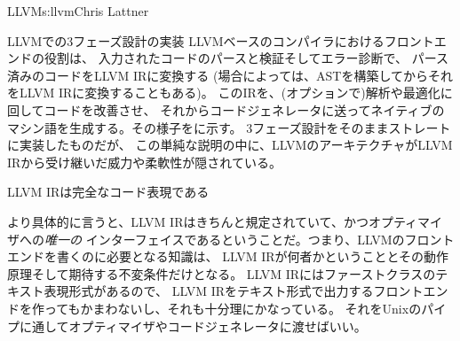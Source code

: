 \begin{aosachapter}{LLVM}{s:llvm}{Chris Lattner}
\begin{aosasect1}{LLVMでの3フェーズ設計の実装}
LLVMベースのコンパイラにおけるフロントエンドの役割は、
入力されたコードのパースと検証そしてエラー診断で、
パース済みのコードをLLVM IRに変換する
(場合によっては、ASTを構築してからそれをLLVM IRに変換することもある)。
このIRを、(オプションで)解析や最適化に回してコードを改善させ、
それからコードジェネレータに送ってネイティブのマシン語を生成する。その様子をに示す。
3フェーズ設計をそのままストレートに実装したものだが、
この単純な説明の中に、LLVMのアーキテクチャがLLVM IRから受け継いだ威力や柔軟性が隠されている。


\begin{aosasect2}{LLVM IRは完全なコード表現である}

より具体的に言うと、LLVM IRはきちんと規定されていて、かつオプティマイザへの\emph{唯一の}
インターフェイスであるということだ。つまり、LLVMのフロントエンドを書くのに必要となる知識は、
LLVM IRが何者かということとその動作原理そして期待する不変条件だけとなる。
LLVM IRにはファーストクラスのテキスト表現形式があるので、
LLVM IRをテキスト形式で出力するフロントエンドを作ってもかまわないし、それも十分理にかなっている。
それをUnixのパイプに通してオプティマイザやコードジェネレータに渡せばいい。


\end{aosasect2}
\end{aosasect1}
\end{aosachapter}
